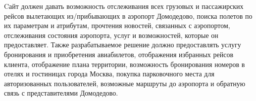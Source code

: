 Cайт должен давать возможность отслеживания 
всех грузовых и пассажирских рейсов вылетающих из/прибывающих в 
аэропорт Домодедово, поиска полетов по их 
параметрам и атрибутам, прочтения новостей, 
связанных с аэропортом, отслеживания состояния 
аэропорта, услуг и возможностей, которые он предоставляет. 
Также разрабатываемое решение должно предоставлять 
услугу бронирования и приобретения авиабилетов, 
отображения избранных рейсов клиента, отображение плана территории, 
возможность бронирования номеров в отелях и гостиницах города Москва, 
покупка парковочного места для авторизованных пользователей,
возможные маршруты до аэропорта и обратную 
связь с представителями Домодедово.
